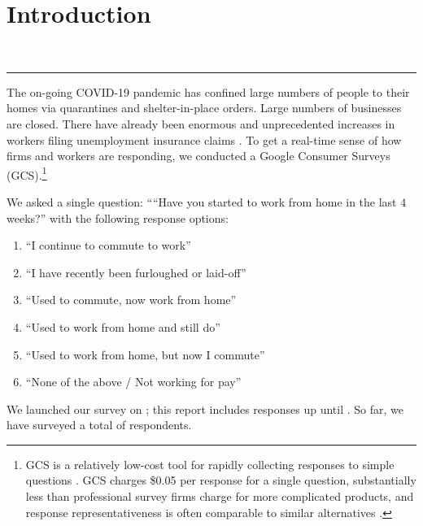 \documentclass[12pt]{article}
\newcommand{\covid}{COVID-19}
\begin{document}
\onehalfspacing 

\section{Introduction}
   \\
   \newline
   \newline
  {\color{red} \rule{\linewidth}{0.5mm}}

The on-going \covid{} pandemic has confined large numbers of people to their homes via quarantines and shelter-in-place orders.
Large numbers of businesses are closed. 
There have already been enormous and unprecedented increases in workers filing unemployment insurance claims \citep{goldsmith2020}. 
To get a real-time sense of how firms and workers are responding, we conducted a Google Consumer Surveys (GCS).\footnote{
GCS is a relatively low-cost tool for rapidly collecting responses to simple questions \cite{stephens2014hands}. 
GCS charges \$0.05 per response for a single question, substantially less than professional survey firms charge for more complicated products, and response representativeness is often comparable to similar alternatives \citep{santoso2016survey, brynjolfsson2019using}.
}

We asked a single question:
````Have you started to work from home in the last 4 weeks?''
with the following response options: 
\begin{enumerate} 
\item ``I continue to commute to work''
\item ``I have recently been furloughed or laid-off''
\item ``Used to commute, now work from home''   
\item ``Used to work from home and still do''       
\item ``Used to work from home, but now I commute''
\item ``None of the above / Not working for pay''
\end{enumerate} 

We launched our survey on \SurveyStart{}; this report includes responses up until \SurveyEnd{}. 
So far, we have surveyed a total of \numObs{} respondents.
\end{document}
